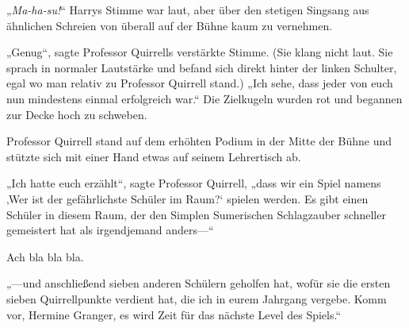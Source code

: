 „\emph{Ma-ha-su!}“ Harrys Stimme war laut, aber über den stetigen Singsang aus ähnlichen Schreien von überall auf der Bühne kaum zu vernehmen.

„Genug“, sagte Professor Quirrells verstärkte Stimme. (Sie klang nicht laut. Sie sprach in normaler Lautstärke und befand sich direkt hinter der linken Schulter, egal wo man relativ zu Professor Quirrell stand.) „Ich sehe, dass jeder von euch nun mindestens einmal erfolgreich war.“ Die Zielkugeln wurden rot und begannen zur Decke hoch zu schweben.

Professor Quirrell stand auf dem erhöhten Podium in der Mitte der Bühne und stützte sich mit einer Hand etwas auf seinem Lehrertisch ab.

„Ich hatte euch erzählt“, sagte Professor Quirrell, „dass wir ein Spiel namens ‚Wer ist der gefährlichste Schüler im Raum?‘ spielen werden. Es gibt einen Schüler in diesem Raum, der den Simplen Sumerischen Schlagzauber schneller gemeistert hat als irgendjemand anders—“

Ach bla bla bla.

„—und anschließend sieben anderen Schülern geholfen hat, wofür sie die ersten sieben Quirrellpunkte verdient hat, die ich in eurem Jahrgang vergebe. Komm vor, Hermine Granger, es wird Zeit für das nächste Level des Spiels.“

